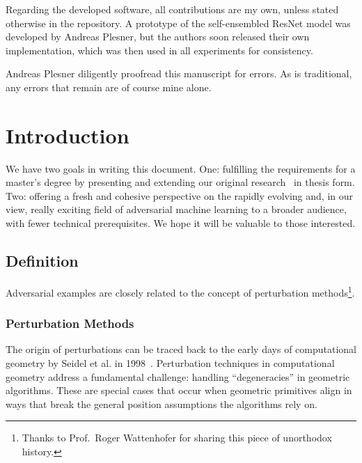 \documentclass[a4paper, oneside]{discothesis}
\begin{document}
Regarding the developed software, all contributions are my own, unless stated otherwise in the repository. A prototype of the self-ensembled ResNet model was developed by Andreas Plesner, but the authors soon released their own implementation, which was then used in all experiments for consistency.

Andreas Plesner diligently proofread this manuscript for errors. As is traditional, any errors that remain are of course mine alone.

\tableofcontents

\mainmatter

\chapter{Introduction}

We have two goals in writing this document. One: fulfilling the requirements for a master's degree by presenting and extending our original research~\cite{jabary2024seeing} in thesis form. Two: offering a fresh and cohesive perspective on the rapidly evolving and, in our view, really exciting field of adversarial machine learning to a broader audience, with fewer technical prerequisites. We hope it will be valuable to those interested.

\section{Definition}

Adversarial examples are closely related to the concept of perturbation methods\footnote{Thanks to Prof.\ Roger Wattenhofer for sharing this piece of unorthodox history.}.

\subsection{Perturbation Methods}

The origin of perturbations can be traced back to the early days of computational geometry by Seidel et al. in 1998~\cite{seidel1998nature}. Perturbation techniques in computational geometry address a fundamental challenge: handling ``degeneracies'' in geometric algorithms. These are special cases that occur when geometric primitives align in ways that break the general position assumptions the algorithms rely on.
\end{document}
